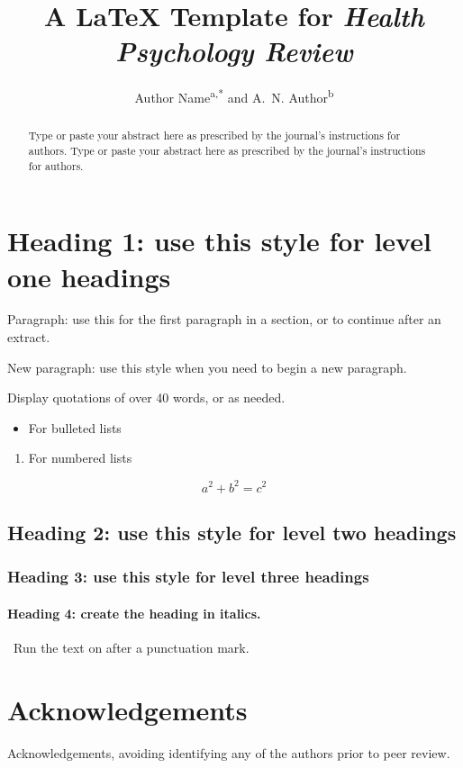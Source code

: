 \documentclass{tandf}
\title{A \LaTeX{} Template for \textit{Health Psychology Review}}
\author{Author Name\textsuperscript{a,*} and A.~N. Author\textsuperscript{b}}
\affiliation{\textsuperscript{a}Department, University, City, Country; \textsuperscript{b}Department, University, City, Country}
\begin{document}
\maketitle
\begin{abstract}
Type or paste your abstract here as prescribed by the journal's instructions for authors. Type or paste your abstract here as prescribed by the journal's instructions for authors.
\end{abstract}
\section{Heading 1: use this style for level one headings}
Paragraph: use this for the first paragraph in a section, or to continue after an extract.

New paragraph: use this style when you need to begin a new paragraph.

Display quotations of over 40 words, or as needed.
\begin{itemize}
  \item For bulleted lists
\end{itemize}
\begin{enumerate}
  \item For numbered lists
\end{enumerate}
\begin{equation}
  a^2 + b^2 = c^2
\end{equation}
\subsection{Heading 2: use this style for level two headings}
\subsubsection{Heading 3: use this style for level three headings}
\paragraph{Heading 4: create the heading in italics.}\ Run the text on after a punctuation mark.
\section{Acknowledgements}
Acknowledgements, avoiding identifying any of the authors prior to peer review.

\nocite{example2026}

\end{document}
